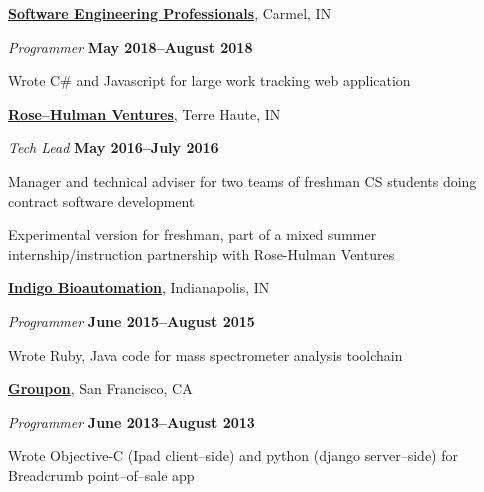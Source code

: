 \documentclass[10pt]{article}
\newenvironment{outerlist}[1][\enskip\textbullet]%
        {\begin{itemize}[#1]}{\end{itemize}%
         \vspace{-.6\baselineskip}}
\newenvironment{innerlist}[1][\enskip\textbullet]%
        {\begin{compactitem}[#1]}{\end{compactitem}}
\newcommand{\blankline}{\quad\pagebreak[2]}
\begin{document}
\href{http://www.sep.com}{\textbf{Software Engineering Professionals}},
Carmel, IN
\begin{outerlist}
\item[] \textit{Programmer}%
    \hfill \textbf{May 2018--August 2018}
    \begin{innerlist}
    \item Wrote C\# and Javascript for large work tracking web application  
    \end{innerlist}
\end{outerlist}
\blankline

\href{http://www.rhventures.org/}{\textbf{Rose--Hulman Ventures}},
Terre Haute, IN
\begin{outerlist}
\item[] \textit{Tech Lead}%
    \hfill \textbf{May 2016--July 2016}
    \begin{innerlist}
    \item Manager and technical adviser for two teams of freshman CS
      students doing contract software development
    \item Experimental version for freshman, part of a mixed summer internship/instruction partnership with Rose-Hulman Ventures 
    \end{innerlist}
\end{outerlist}
\blankline


\href{http://www.indigobio.com/}{\textbf{Indigo Bioautomation}},
Indianapolis, IN
\begin{outerlist}
\item[] \textit{Programmer}%
    \hfill \textbf{June 2015--August 2015}
    \begin{innerlist}
    \item Wrote Ruby, Java code for mass spectrometer analysis toolchain
    \end{innerlist}
\end{outerlist}
\blankline

\href{http://www.groupon.com/}{\textbf{Groupon}},
San Francisco, CA
\begin{outerlist}
\item[] \textit{Programmer}%
    \hfill \textbf{June 2013--August 2013}
    \begin{innerlist}
    \item Wrote Objective-C (Ipad client--side) and python (django server--side) for Breadcrumb point--of--sale app
    \end{innerlist}
\end{outerlist}
\blankline
\end{document}
